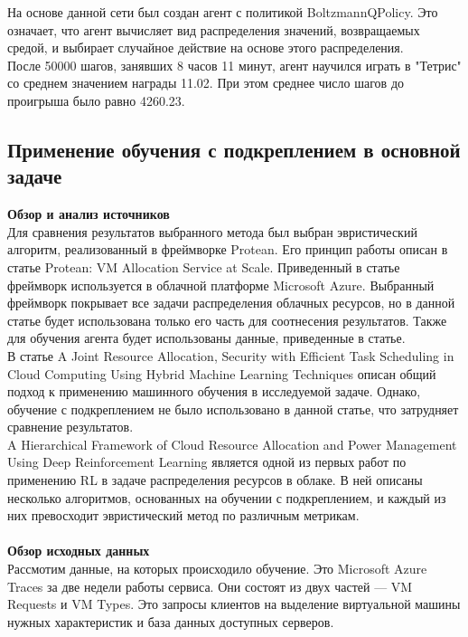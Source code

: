 \documentclass{article}
\begin{document}
На основе данной сети был создан агент с политикой BoltzmannQPolicy. Это означает, что агент вычисляет вид распределения значений, возвращаемых средой, и выбирает случайное действие на основе этого распределения.\\
После 50000 шагов, занявших 8 часов 11 минут, агент научился играть в "Тетрис" со среднем значением награды 11.02. При этом среднее число шагов до проигрыша было равно 4260.23.\\
\newpage
\begin{center}
\item\subsection{Применение обучения с подкреплением в основной задаче}
\end{center}
\textbf{Обзор и анализ источников}\\
Для сравнения результатов выбранного метода был выбран эвристический алгоритм, реализованный в фреймворке Protean. Его принцип работы описан в статье Protean: VM Allocation Service at Scale\cite{litlink21}. Приведенный в статье фреймворк используется в облачной платформе Microsoft Azure. Выбранный фреймворк покрывает все задачи распределения облачных ресурсов, но в данной статье будет использована только его часть для соотнесения результатов. Также для обучения агента будет использованы данные, приведенные в статье\cite{litlink22}.\\
В статье A Joint Resource Allocation, Security with Efficient Task Scheduling in Cloud Computing Using Hybrid Machine Learning Techniques\cite{litlink23} описан общий подход к применению машинного обучения в исследуемой задаче. Однако, обучение с подкреплением не было использовано в данной статье, что затрудняет сравнение результатов.\\
A Hierarchical Framework of Cloud Resource Allocation and Power Management Using Deep Reinforcement Learning\cite{litlink24} является одной из первых работ по применению RL в задаче распределения ресурсов в облаке. В ней описаны несколько алгоритмов, основанных на обучении с подкреплением, и каждый из них превосходит эвристический метод по различным метрикам.\\~\\
\textbf{Обзор исходных данных}\\
Рассмотим данные, на которых происходило обучение. Это Microsoft Azure Traces за две недели работы сервиса. Они состоят из двух частей — VM Requests и VM Types. Это запросы клиентов на выделение виртуальной машины нужных характеристик и база данных доступных серверов. 
\end{document}
